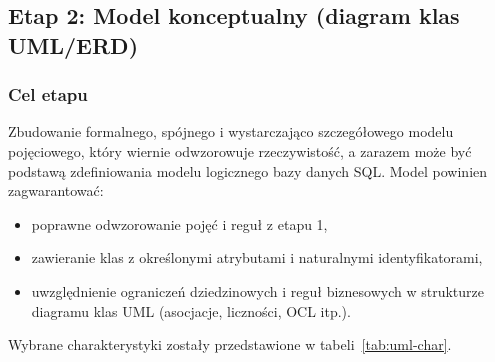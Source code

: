 \subsection*{Etap 2: Model konceptualny (diagram klas UML/ERD)}

\subsubsection*{Cel etapu}

Zbudowanie formalnego, spójnego i wystarczająco szczegółowego modelu pojęciowego, który wiernie odwzorowuje rzeczywistość, a zarazem może być podstawą zdefiniowania modelu logicznego bazy danych SQL. Model powinien zagwarantować:
\begin{itemize}
  \item poprawne odwzorowanie pojęć i reguł z etapu 1,
  \item zawieranie klas z określonymi atrybutami i naturalnymi identyfikatorami,
  \item uwzględnienie ograniczeń dziedzinowych i reguł biznesowych w strukturze diagramu klas UML (asocjacje, liczności, OCL itp.).
\end{itemize}

Wybrane charakterystyki zostały przedstawione w tabeli~\ref{tab:uml-char}.

